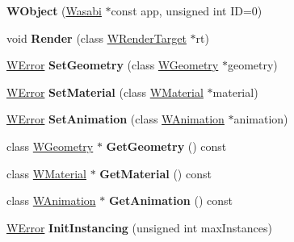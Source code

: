 \begin{DoxyCompactItemize}
\item 
{\bfseries W\+Object} (\hyperlink{class_wasabi}{Wasabi} $\ast$const app, unsigned int ID=0)\hypertarget{class_w_object_ae01d22761e4282b9f3d3ebf23d64f4b8}{}\label{class_w_object_ae01d22761e4282b9f3d3ebf23d64f4b8}

\item 
void {\bfseries Render} (class \hyperlink{class_w_render_target}{W\+Render\+Target} $\ast$rt)\hypertarget{class_w_object_a315a4d624c6e6c5fef996e1dd87abe33}{}\label{class_w_object_a315a4d624c6e6c5fef996e1dd87abe33}

\item 
\hyperlink{class_w_error}{W\+Error} {\bfseries Set\+Geometry} (class \hyperlink{class_w_geometry}{W\+Geometry} $\ast$geometry)\hypertarget{class_w_object_a473a8002f7bb6581ecb38937ff1df10e}{}\label{class_w_object_a473a8002f7bb6581ecb38937ff1df10e}

\item 
\hyperlink{class_w_error}{W\+Error} {\bfseries Set\+Material} (class \hyperlink{class_w_material}{W\+Material} $\ast$material)\hypertarget{class_w_object_add4eb131afa0b55fbb4d5695eee7569c}{}\label{class_w_object_add4eb131afa0b55fbb4d5695eee7569c}

\item 
\hyperlink{class_w_error}{W\+Error} {\bfseries Set\+Animation} (class \hyperlink{class_w_animation}{W\+Animation} $\ast$animation)\hypertarget{class_w_object_aa78d1b389d67bc5a9ee9fd64d559e64a}{}\label{class_w_object_aa78d1b389d67bc5a9ee9fd64d559e64a}

\item 
class \hyperlink{class_w_geometry}{W\+Geometry} $\ast$ {\bfseries Get\+Geometry} () const \hypertarget{class_w_object_a21ff26282c4c6e76b9e93749a53e8a67}{}\label{class_w_object_a21ff26282c4c6e76b9e93749a53e8a67}

\item 
class \hyperlink{class_w_material}{W\+Material} $\ast$ {\bfseries Get\+Material} () const \hypertarget{class_w_object_a4832d77d13177c26165833be034db5b3}{}\label{class_w_object_a4832d77d13177c26165833be034db5b3}

\item 
class \hyperlink{class_w_animation}{W\+Animation} $\ast$ {\bfseries Get\+Animation} () const \hypertarget{class_w_object_a1fd40c0623b666c46a5d5a4508dec979}{}\label{class_w_object_a1fd40c0623b666c46a5d5a4508dec979}

\item 
\hyperlink{class_w_error}{W\+Error} {\bfseries Init\+Instancing} (unsigned int max\+Instances)\hypertarget{class_w_object_a3eb6c8b80c1cc3ca3149be1647f3abb4}{}\label{class_w_object_a3eb6c8b80c1cc3ca3149be1647f3abb4}


\end{DoxyCompactItemize}
